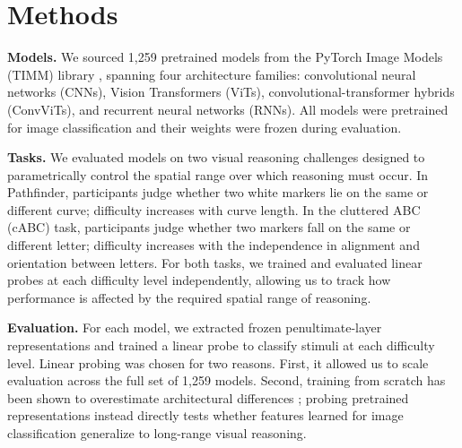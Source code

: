\documentclass[10pt,letterpaper]{article}
\begin{document}

\section{Methods}

\textbf{Models.} We sourced 1,259 pretrained models from the PyTorch Image Models (TIMM) library \citep{Wightman}, spanning four architecture families: convolutional neural networks (CNNs), Vision Transformers (ViTs), convolutional-transformer hybrids (ConvViTs), and recurrent neural networks (RNNs). All models were pretrained for image classification and their weights were frozen during evaluation.

\textbf{Tasks.} We evaluated models on two visual reasoning challenges designed to parametrically control the spatial range over which reasoning must occur. In Pathfinder, participants judge whether two white markers lie on the same or different curve; difficulty increases with curve length. In the cluttered ABC (cABC) task, participants judge whether two markers fall on the same or different letter; difficulty increases with the independence in alignment and orientation between letters. For both tasks, we trained and evaluated linear probes at each difficulty level independently, allowing us to track how performance is affected by the required spatial range of reasoning.

\textbf{Evaluation.} For each model, we extracted frozen penultimate-layer representations and trained a linear probe to classify stimuli at each difficulty level. Linear probing was chosen for two reasons. First, it allowed us to scale evaluation across the full set of 1,259 models. Second, training from scratch has been shown to overestimate architectural differences \citep{Amos}; probing pretrained representations instead directly tests whether features learned for image classification generalize to long-range visual reasoning.
\end{document}
